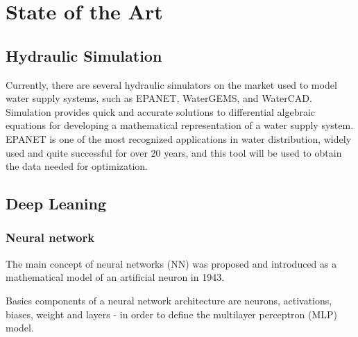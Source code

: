 \chapter{State of the Art}%
\label{chapter:state-of-the-art}



\section{Hydraulic Simulation}

\begin{comment}
Atualmente no mercado existem diversos simuladores hidráulicos que são utilizados para modelar sistemas de abastecimento de água. Dentre eles, podemos citar o EPANET, WaterGEMS, WaterCAD, entre outros. A simulação permite oferecer soluções rápidas e precisas para equações algébricas diferenciais usadas para desenvolver a representação matemática de um sistema de abastecimento de água\cite{rfc1}. O EPANET é um dos mais reconhecidos aplicativos na área de distribuição de água\cite{rfc4}, amplamente utilizaddo e com muito sucesso\cite{rfc5} há mais de 20 anos\cite{rfc6} e é esta ferramenta a ser utilizada na simulação para obtenção dos dados necessários para a otimização.    
\end{comment}


Currently, there are several hydraulic simulators on the market used to model water supply systems, such as EPANET, WaterGEMS, and WaterCAD. Simulation provides quick and accurate solutions to differential algebraic equations for developing a mathematical representation of a water supply system\cite{rfc1}. EPANET is one of the most recognized applications in water distribution\cite{rfc4}, widely used and quite successful\cite{rfc5} for over 20 years\cite{rfc6}, and this tool will be used to obtain the data needed for optimization.


\section{Deep Leaning}


\subsection{Neural network}

The main concept of neural networks (NN) was proposed and introduced as a mathematical model of an artificial neuron in 1943\cite{rfc23}.

Basics components of a neural network architecture are neurons, activations, biases, weight and layers - in order to define the multilayer perceptron (MLP) model.\cite{rfc23}


